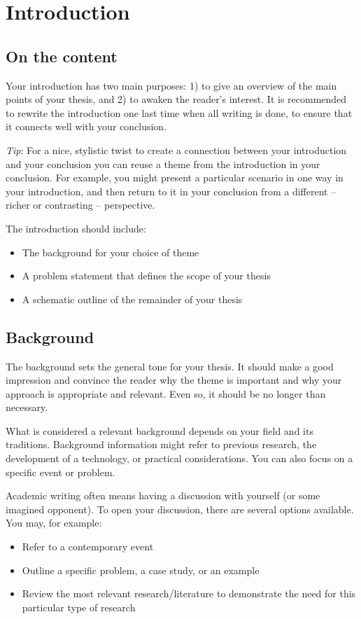 \documentclass[a4paper,twoside]{bth}
\begin{document}

\chapter{Introduction}
\label{chp:introduction}  %
\section{On the content}
Your introduction has two main purposes: 1) to give an overview of the main points of your thesis, and 2) to awaken the reader's interest. It is recommended to rewrite the introduction one last time when all writing is done, to ensure that it connects well with your conclusion.

\emph{Tip}: For a nice, stylistic twist to create a connection between your introduction and your conclusion you can reuse a theme from the introduction in your conclusion. For example, you might present a particular scenario in one way in your introduction, and then return to it in your conclusion from a different -- richer or contrasting -- perspective.

The introduction should include:
\begin{itemize}
    \item The background for your choice of theme
    \item A problem statement that defines the scope of your thesis
    \item A schematic outline of the remainder of your thesis 
\end{itemize}


\section{Background}
The background sets the general tone for your thesis. It should make a good impression and convince the reader why the theme is important and why your approach is appropriate and relevant. Even so, it should be no longer than necessary.

What is considered a relevant background depends on your field and its traditions. Background information might refer to previous research, the development of a technology, or practical considerations. You can also focus on a specific event or problem.

Academic writing often means having a discussion with yourself (or some imagined opponent). To open your discussion, there are several options available. You may, for example:
\begin{itemize}
    \item Refer to a contemporary event
    \item Outline a specific problem, a case study, or an example
    \item Review the most relevant research/literature to demonstrate the need for this particular type of research 
\end{itemize}
\end{document}
